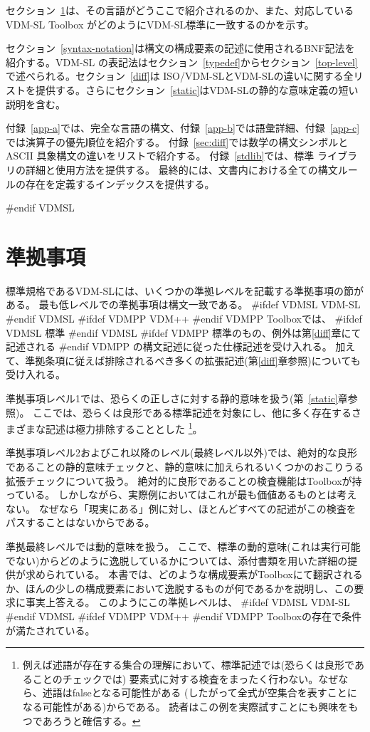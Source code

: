 \documentclass[\pformat,12pt]{jarticle}
\newcommand{\vdmslpp}[2]{%
#ifdef VDMSL
#1
#endif VDMSL
#ifdef VDMPP
#2
#endif VDMPP
}
\newcommand{\vdmsl}{VDM-SL}
\newcommand{\vdmpp}{VDM++}
\begin{document}
セクション~\ref{conformance}は、その言語がどうここで紹介されるのか、また、対応しているVDM-SL Toolbox
がどのようにVDM-SL標準に一致するのかを示す。

セクション~\ref{syntax-notation}は構文の構成要素の記述に使用されるBNF記法を紹介する。VDM-SL
の表記法はセクション~\ref{typedef}からセクション~\ref{top-level}で述べられる。セクション~\ref{diff}は
ISO/VDM-SLとVDM-SLの違いに関する全リストを提供する。さらにセクション~\ref{static}はVDM-SLの静的な意味定義の短い説明を含む。

付録~\ref{app-a}では、完全な言語の構文、付録~\ref{app-b}では語彙詳細、付録~\ref{app-c}では演算子の優先順位を紹介する。
付録~\ref{sec:diff}では数学の構文シンボルとASCII 具象構文の違いをリストで紹介する。
付録~\ref{stdlib}では、標準 ライブラリの詳細と使用方法を提供する。
最終的には、文書内における全ての構文ルールの存在を定義するインデックスを提供する。

#endif VDMSL

\section{準拠事項}
\label{conformance}

標準規格であるVDM-SLには、いくつかの準拠レベルを記載する準拠事項の節がある。
最も低レベルでの準拠事項は構文一致である。
\vdmslpp{\vdmsl}{\vdmpp} Toolboxでは、\vdmslpp{標準}{標準のもの、例外は第\ref{diff}章にて記述される}の構文記述に従った仕様記述を受け入れる。
加えて、準拠条項に従えば排除されるべき多くの拡張記述(第\ref{diff}章参照)についても受け入れる。

準拠事項レベル1では、恐らくの正しさに対する静的意味を扱う(第~\ref{static}章参照)。
ここでは、恐らくは良形である標準記述を対象にし、他に多く存在するさまざまな記述は極力排除することとした
\footnote{例えば述語が存在する集合の理解において、標準記述では(恐らくは良形であることのチェックでは)
要素式に対する検査をまったく行わない。なぜなら、述語はfalseとなる可能性がある
(したがって全式が空集合を表すことになる可能性がある)からである。
読者はこの例を実際試すことにも興味をもつであろうと確信する。}。

準拠事項レベル2およびこれ以降のレベル(最終レベル以外)では、絶対的な良形であることの静的意味チェックと、静的意味に加えられるいくつかのおこりうる拡張チェックについて扱う。
絶対的に良形であることの検査機能はToolboxが持っている。
しかしながら、実際例においてはこれが最も価値あるものとは考えない。
なぜなら「現実にある」例に対し、ほとんどすべての記述がこの検査をパスすることはないからである。

準拠最終レベルでは動的意味を扱う。
ここで、標準の動的意味(これは実行可能でない)からどのように逸脱しているかについては、添付書類を用いた詳細の提供が求められている。
本書では、どのような構成要素がToolboxにて翻訳されるか、ほんの少しの構成要素において逸脱するものが何であるかを説明し、この要求に事実上答える。
このようにこの準拠レベルは、\vdmslpp{VDM-SL}{\vdmpp}Toolboxの存在で条件が満たされている。
\end{document}
